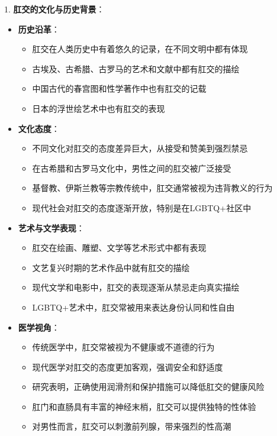 \documentclass[12pt,UTF8]{ctexbook}
\begin{document}
1. \textbf{肛交的文化与历史背景}：
\begin{itemize}
	\item \textbf{历史沿革}：
	\begin{itemize}
		\item 肛交在人类历史中有着悠久的记录，在不同文明中都有体现
		\item 古埃及、古希腊、古罗马的艺术和文献中都有肛交的描绘
		\item 中国古代的春宫图和性学著作中也有肛交的记载
		\item 日本的浮世绘艺术中也有肛交的表现
	\end{itemize}
	\item \textbf{文化态度}：
	\begin{itemize}
		\item 不同文化对肛交的态度差异巨大，从接受和赞美到强烈禁忌
		\item 在古希腊和古罗马文化中，男性之间的肛交被广泛接受
		\item 基督教、伊斯兰教等宗教传统中，肛交通常被视为违背教义的行为
		\item 现代社会对肛交的态度逐渐开放，特别是在LGBTQ+社区中
	\end{itemize}
	\item \textbf{艺术与文学表现}：
	\begin{itemize}
		\item 肛交在绘画、雕塑、文学等艺术形式中都有表现
		\item 文艺复兴时期的艺术作品中就有肛交的描绘
		\item 现代文学和电影中，肛交的表现逐渐从禁忌走向真实描绘
		\item LGBTQ+艺术中，肛交常被用来表达身份认同和性自由
	\end{itemize}
	\item \textbf{医学视角}：
	\begin{itemize}
		\item 传统医学中，肛交常被视为不健康或不道德的行为
		\item 现代医学对肛交的态度更加客观，强调安全和舒适度
		\item 研究表明，正确使用润滑剂和保护措施可以降低肛交的健康风险
		\item 肛门和直肠具有丰富的神经末梢，肛交可以提供独特的性体验
		\item 对男性而言，肛交可以刺激前列腺，带来强烈的性高潮
	\end{itemize}
\end{itemize}
\end{document}
